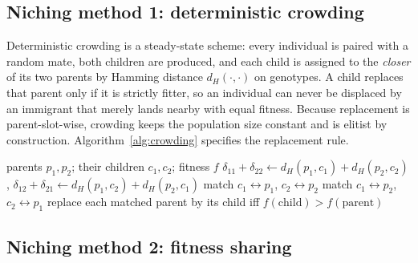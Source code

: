\documentclass[conference]{IEEEtran}
\begin{document}
\subsection{Niching method 1: deterministic crowding}
\label{sec:crowding}

Deterministic crowding \cite{b2} is a steady-state scheme: every individual is
paired with a random mate, both children are produced, and each child is
assigned to the \emph{closer} of its two parents by Hamming distance
$d_H(\cdot,\cdot)$ on genotypes. A child replaces that parent only if it is
strictly fitter, so an individual can never be displaced by an immigrant that
merely lands nearby with equal fitness. Because replacement is
parent-slot-wise, crowding keeps the population size constant and is elitist by
construction. Algorithm~\ref{alg:crowding} specifies the replacement rule.

\begin{algorithm}[t]
\caption{Deterministic crowding replacement (per mating pair)}
\label{alg:crowding}
\begin{algorithmic}[1]
\REQUIRE parents $p_1, p_2$; their children $c_1, c_2$; fitness $f$
\STATE $\delta_{11}+\delta_{22} \leftarrow d_H(p_1,c_1)+d_H(p_2,c_2)$,
  $\delta_{12}+\delta_{21} \leftarrow d_H(p_1,c_2)+d_H(p_2,c_1)$
  \STATE match $c_1 \leftrightarrow p_1$, $c_2 \leftrightarrow p_2$
\ELSE
  \STATE match $c_1 \leftrightarrow p_2$, $c_2 \leftrightarrow p_1$
\ENDIF
\STATE replace each matched parent by its child iff
  $f(\text{child}) > f(\text{parent})$
\end{algorithmic}
\end{algorithm}

\subsection{Niching method 2: fitness sharing}
\label{sec:sharing}
\end{document}
